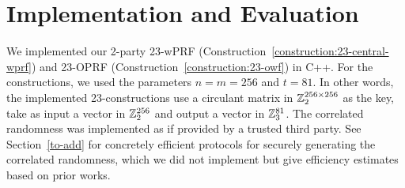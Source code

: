 
\iffalse
\section{Experiments and Evaluation}

\paragraph{Experimental setup.}

\paragraph{Optimizations.}
e.g., preprocessing table, bit packing etc.

\paragraph{Core primitive benchmarks.}

\paragraph{Centralized vs distributed benchmarks.}

\paragraph{Comparison to existing approaches.}

\fi


\newpage
\section{Implementation and Evaluation}
\label{sec:implementation_and_eval}
We implemented our 2-party 23-wPRF (Construction~\ref{construction:23-central-wprf}) and 23-OPRF (Construction~\ref{construction:23-owf})  in C++. For the constructions, we used the parameters $n = m = 256$ and $t = 81$. In other words, the implemented 23-constructions use a circulant matrix in $\mathbb{Z}_2^{256 \times 256}$ as the key, take as input a vector in $\mathbb{Z}_2^{256}$ and output a vector in $\mathbb{Z}_3^{81}$. The correlated randomness was implemented as if provided by a trusted third party.  See Section~\ref{to-add} for concretely efficient protocols for securely generating the correlated randomness, which we did not implement but give efficiency estimates based on prior works.  

